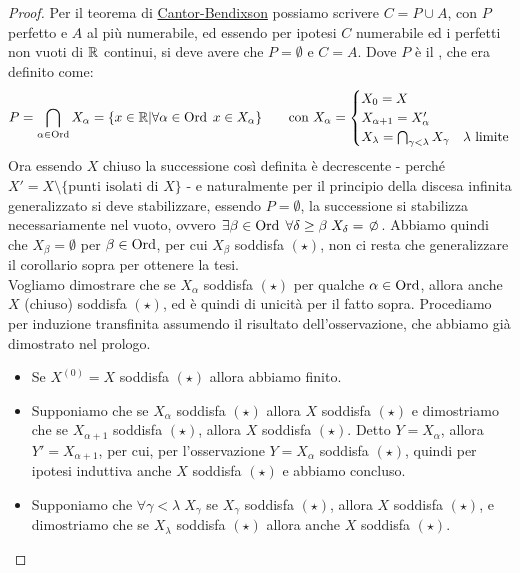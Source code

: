 \begin{proof}
	Per il teorema di \hyperref[Cantor_Bendixson]{Cantor-Bendixson} possiamo scrivere $C = P \cup A$, con $P$ perfetto e $A$ al pi\`u numerabile, ed essendo per ipotesi $C$ numerabile ed i perfetti non vuoti di $\mathbb R$ continui,
	si deve avere che $P = \emptyset$ e $C = A$. Dove $P$ \`e il , che era definito come:
	\[ P = \bigcap_{\alpha \in \operatorname{Ord}}X_\alpha = \{x \in \mathbb R |\forall \alpha \in\operatorname{Ord} \; x \in X_\alpha \} \qquad \text{con }X_\alpha = \begin{cases}
		X_0 = X \\
		X_{\alpha + 1} = X'_\alpha \\
		X_\lambda = \bigcap_{\gamma < \lambda}X_\gamma &\text{$\lambda$ limite}
	\end{cases}
		\]
	Ora essendo $X$ chiuso la successione cos\`i definita \`e decrescente - perch\'e $X' = X\setminus\{\text{punti isolati di $X$}\}$ - e naturalmente per il principio della discesa infinita generalizzato si deve stabilizzare,
	essendo $P = \emptyset$, la successione si stabilizza necessariamente nel vuoto, ovvero $\exists \beta \in \Ord \; \forall \delta \geq \beta \; X_\delta = \emptyset$. Abbiamo quindi che $X_\beta = \emptyset$ per $\beta \in \operatorname{Ord}$, per cui $X_\beta$ soddisfa $(\star)$, non ci resta che generalizzare il corollario sopra per ottenere la tesi.\\
	Vogliamo dimostrare che se $X_\alpha$ soddisfa $(\star)$ per qualche $\alpha \in \operatorname{Ord}$, allora anche $X$ (chiuso) soddisfa $(\star)$, ed \`e quindi di unicit\`a per il fatto sopra. Procediamo per induzione transfinita assumendo il risultato dell'osservazione, che abbiamo gi\`a dimostrato nel prologo.
	\begin{itemize}
		\item[$\boxed{\text{caso 0}}$] Se $X^{(0)} = X$ soddisfa $(\star)$ allora abbiamo finito.
		\item[$\boxed{\text{caso successore}}$] Supponiamo che se $X_\alpha$ soddisfa $(\star)$ allora $X$ soddisfa $(\star)$ e dimostriamo che se $X_{\alpha+1}$ soddisfa $(\star)$, allora $X$ soddisfa $(\star)$.
		Detto $Y = X_\alpha$, allora $Y' = X_{\alpha + 1}$, per cui, per l'osservazione $Y = X_\alpha$ soddisfa $(\star)$, quindi per ipotesi induttiva anche $X$ soddisfa $(\star)$ e abbiamo concluso.
		\item[$\boxed{\text{caso limite}}$] Supponiamo che $\forall \gamma < \lambda \; X_\gamma$ se $X_\gamma$ soddisfa $(\star)$, allora $X$ soddisfa $(\star)$, e dimostriamo che se $X_\lambda$ soddisfa $(\star)$ allora anche $X$ soddisfa $(\star)$.\\

\end{itemize}
\end{proof}
